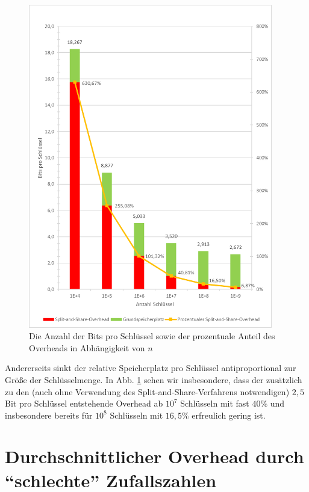 \documentclass[a4paper,12pt,twoside]{report}
\begin{document}
\begin{figure}[tbhp]
\centering
\includegraphics[width=0.95\textwidth]{diagrams/SplitAndShareOverhead.png} 
\caption{Die Anzahl der Bits pro Schlüssel sowie der prozentuale Anteil des Overheads in Abhängigkeit von $n$}
\label{img:SplitAndShareOverhead}
\end{figure}
Andererseits sinkt der relative Speicherplatz pro Schlüssel antiproportional zur Größe der Schlüsselmenge.
In Abb. \ref{img:SplitAndShareOverhead} sehen wir insbesondere, dass der zusätzlich zu den (auch ohne Verwendung des Split-and-Share-Verfahrens notwendigen) $2,5$ Bit pro Schlüssel entstehende Overhead ab $10^7$ Schlüsseln mit fast $40\%$ und insbesondere bereits für $10^8$ Schlüsseln mit $16,5\%$ erfreulich gering ist.

\section{Durchschnittlicher Overhead durch ``schlechte'' Zufallszahlen}
\label{sec:overheadZufallszahlen}
\end{document}
